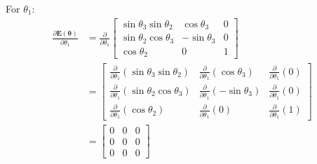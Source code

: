 \documentclass[titlepage]{article}
\begin{document}
For $\theta_1$:
\begin{equation}
	\begin{split}
		\frac{\partial\boldsymbol{E}(\boldsymbol{\theta})}{\partial\theta_1}&=\frac{\partial}{\partial\theta_1}
		\begin{bmatrix}
			\sin\theta_3\sin\theta_2 & \cos\theta_3 & 0 \\
			\sin\theta_2\cos\theta_3 & -\sin\theta_3 & 0 \\
			\cos\theta_2 & 0 & 1
		\end{bmatrix} \\
		&=
		\begin{bmatrix}
			\frac{\partial}{\partial\theta_1}\left(\sin\theta_3\sin\theta_2\right) & \frac{\partial}{\partial\theta_1}\left(\cos\theta_3\right) & \frac{\partial}{\partial\theta_1}\left(0\right) \\
			\frac{\partial}{\partial\theta_1}\left(\sin\theta_2\cos\theta_3\right) & \frac{\partial}{\partial\theta_1}\left(-\sin\theta_3\right) & \frac{\partial}{\partial\theta_1}\left(0\right) \\
			\frac{\partial}{\partial\theta_1}\left(\cos\theta_2\right) & \frac{\partial}{\partial\theta_1}\left(0\right) & \frac{\partial}{\partial\theta_1}\left(1\right)
		\end{bmatrix} \\
		&=
		\begin{bmatrix}
			0 & 0 & 0 \\
			0 & 0 & 0 \\
			0 & 0 & 0 
		\end{bmatrix} \\
	\end{split}
\end{equation}
\end{document}
